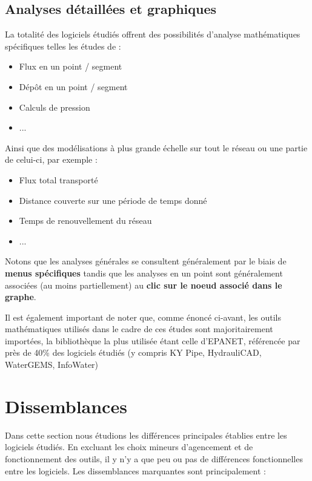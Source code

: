 \documentclass[a4paper, 11pt]{article}
\begin{document}
\subsection{Analyses détaillées et graphiques}
La totalité des logiciels étudiés offrent des possibilités d'analyse mathématiques spécifiques telles les études de :
\begin{itemize}
    \item Flux en un point / segment
    \item Dépôt en un point / segment
    \item Calculs de pression
    \item ...
\end{itemize}
Ainsi que des modélisations à plus grande échelle sur tout le réseau ou une partie de celui-ci, par exemple :
\begin{itemize}
    \item Flux total transporté
    \item Distance couverte sur une période de temps donné
    \item Temps de renouvellement du réseau
    \item ...
\end{itemize}

Notons que les analyses générales se consultent généralement par le biais de \textbf{menus spécifiques} tandis que les analyses en un point sont généralement associées (au moins partiellement) au \textbf{clic sur le noeud associé dans le graphe}.

Il est également important de noter que, comme énoncé ci-avant, les outils mathématiques utilisés dans le cadre de ces études sont majoritairement importées, la bibliothèque la plus utilisée étant celle d'EPANET, référencée par près de 40\% des logiciels étudiés (y compris KY Pipe, HydrauliCAD, WaterGEMS, InfoWater)

\section{Dissemblances}
Dans cette section nous étudions les différences principales établies entre les logiciels étudiés. En excluant les choix mineurs d'agencement et de fonctionnement des outils, il y n'y a que peu ou pas de différences fonctionnelles entre les logiciels. Les dissemblances marquantes sont principalement :
\end{document}
